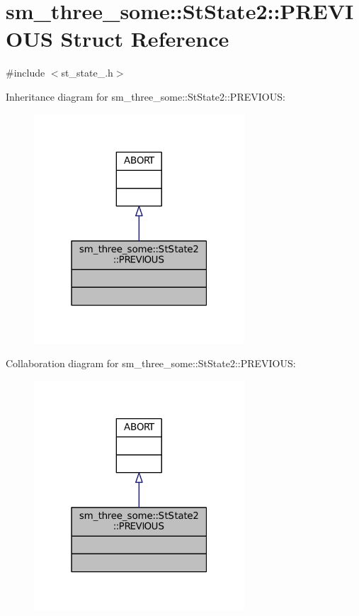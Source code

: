 \hypertarget{structsm__three__some_1_1StState2_1_1PREVIOUS}{}\section{sm\+\_\+three\+\_\+some\+:\+:St\+State2\+:\+:P\+R\+E\+V\+I\+O\+US Struct Reference}
\label{structsm__three__some_1_1StState2_1_1PREVIOUS}


{\ttfamily \#include $<$st\+\_\+state\+\_.\+h$>$}



Inheritance diagram for sm\+\_\+three\+\_\+some\+:\+:St\+State2\+:\+:P\+R\+E\+V\+I\+O\+US\+:
\nopagebreak
\begin{figure}[H]
\begin{center}
\leavevmode
\includegraphics[width=223pt]{structsm__three__some_1_1StState2_1_1PREVIOUS__inherit__graph}
\end{center}
\end{figure}


Collaboration diagram for sm\+\_\+three\+\_\+some\+:\+:St\+State2\+:\+:P\+R\+E\+V\+I\+O\+US\+:
\nopagebreak
\begin{figure}[H]
\begin{center}
\leavevmode
\includegraphics[width=223pt]{structsm__three__some_1_1StState2_1_1PREVIOUS__coll__graph}
\end{center}
\end{figure}


